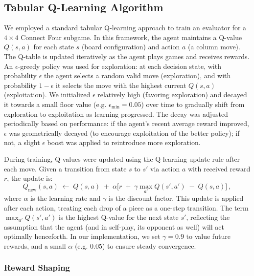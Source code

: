 \documentclass[10pt]{extarticle}
\begin{document}
\subsection{Tabular Q-Learning Algorithm}

We employed a standard tabular Q-learning approach \cite{Sutton2018} to train an evaluator for a $4 \times 4$ Connect Four subgame. In this framework, the agent maintains a Q-value $Q(s,a)$ for each state $s$ (board configuration) and action $a$ (a column move). The Q-table is updated iteratively as the agent plays games and receives rewards. An $\epsilon$-greedy policy was used for exploration: at each decision state, with probability $\epsilon$ the agent selects a random valid move (exploration), and with probability $1-\epsilon$ it selects the move with the highest current $Q(s,a)$ (exploitation). We initialized $\epsilon$ relatively high (favoring exploration) and decayed it towards a small floor value (e.g. $\epsilon_{\min}=0.05$) over time to gradually shift from exploration to exploitation as learning progressed. The decay was adjusted periodically based on performance: if the agent's recent average reward improved, $\epsilon$ was geometrically decayed (to encourage exploitation of the better policy); if not, a slight $\epsilon$ boost was applied to reintroduce more exploration.

During training, Q-values were updated using the Q-learning update rule after each move. Given a transition from state $s$ to $s'$ via action $a$ with received reward $r$, the update is:
\begin{equation}
	Q_{\text{new}}(s, a) \;\leftarrow\; Q(s, a) \;+\; \alpha \Big[ r \;+\; \gamma \max_{a'} Q(s', a') \;-\; Q(s, a) \Big]~,
\end{equation}
where $\alpha$ is the learning rate and $\gamma$ is the discount factor. This update is applied after each action, treating each drop of a piece as a one-step transition. The term $\max_{a'}Q(s',a')$ is the highest Q-value for the next state $s'$, reflecting the assumption that the agent (and in self-play, its opponent as well) will act optimally henceforth. In our implementation, we set $\gamma = 0.9$ to value future rewards, and a small $\alpha$ (e.g. $0.05$) to ensure steady convergence.

\subsubsection{Reward Shaping}
\end{document}
